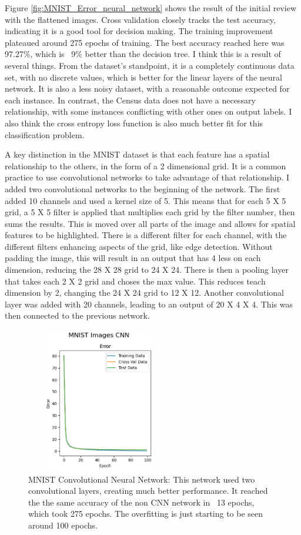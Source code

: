 \documentclass[letterpaper]{article} %
\begin{document}
Figure \ref{fig:MNIST_Error_neural_network} shows the result of the initial review with the flattened images.  Cross validation closely tracks the test accuracy, indicating it is a good tool for decision making.  The training improvement plateaued around 275 epochs of training.  The best accuracy reached here was 97.27\%, which is ~9\% better than the decision tree.  I think this is a result of several things.  From the dataset's standpoint, it is a completely continuous data set, with no discrete values, which is better for the linear layers of the neural network.  It is also a less noisy dataset, with a reasonable outcome expected for each instance.  In contrast, the Census data does not have a necessary relationship, with some instances conflicting with other ones on output labels.  I also think the cross entropy loss function is also much better fit for this classification problem.

A key distinction in the MNIST dataset is that each feature has a spatial relationship to the others, in the form of a 2 dimensional grid.  It is a common practice to use convolutional networks to take advantage of that relationship.  I added two convolutional networks to the beginning of the network.  The first added 10 channels and used a kernel size of 5.  This means that for each 5 X 5 grid, a 5 X 5 filter is applied that multiplies each grid by the filter number, then sums the results.  This is moved over all parts of the image and allows for spatial features to be highlighted.  There is a different filter for each channel, with the different filters enhancing aspects of the grid, like edge detection.  Without padding the image, this will result in an output that has 4 less on each dimension, reducing the 28 X 28 grid to 24 X 24.   There is then a pooling layer that takes each 2 X 2 grid and choses the max value.  This reduces teach dimension by 2, changing the 24 X 24 grid to 12 X 12.  Another convolutional layer was added with 20 channels, leading to an output of 20 X 4 X 4.  This was then connected to the previous network.

\begin{figure}[htb]
\centering
\includegraphics[width=2.5in, height=2.5in]{figures/MNIST_Images_CNN_Error_MNIST.png}
\caption{MNIST Convolutional Neural Network:  This network used two convolutional layers, creating much better performance.  It reached the the same accuracy of the non CNN network in ~13 epochs, which took 275 epochs.  The overfitting is just starting to be seen around 100 epochs. }
\label{fig:MNIST_Error_MNIST_cnn}
\end{figure}
\end{document}
